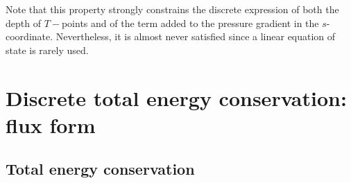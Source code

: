 \documentclass[../main/NEMO_manual]{subfiles}
\begin{document}

Note that this property strongly constrains the discrete expression of both the depth of $T-$points and
of the term added to the pressure gradient in the $s$-coordinate.
Nevertheless, it is almost never satisfied since a linear equation of state is rarely used.

\section{Discrete total energy conservation: flux form}
\label{sec:INVARIANTS_3}

\subsection{Total energy conservation}
\label{subsec:INVARIANTS_KE+PE_flux}
\end{document}

